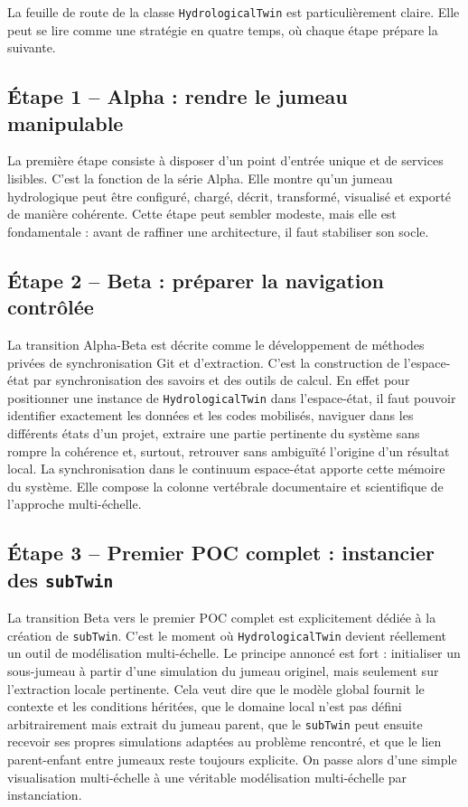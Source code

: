 \documentclass[11pt,a4paper]{article}
\newcommand{\hydrot}{\texttt{HydrologicalTwin}}
\newcommand{\subt}{\texttt{subTwin}}
\begin{document}
La feuille de route de la classe \texttt{HydrologicalTwin} est particulièrement claire. Elle peut se lire comme une stratégie en quatre temps, où chaque étape prépare la suivante.

\subsection{Étape 1 -- Alpha : rendre le jumeau manipulable}

La première étape consiste à disposer d'un point d'entrée unique et de services lisibles. C'est la fonction de la série Alpha. Elle montre qu'un jumeau hydrologique peut être configuré, chargé, décrit, transformé, visualisé et exporté de manière cohérente. Cette étape peut sembler modeste, mais elle est fondamentale : avant de raffiner une architecture, il faut stabiliser son socle.

\subsection{Étape 2 -- Beta : préparer la navigation contrôlée}

La transition Alpha-Beta est décrite comme le développement de méthodes privées de synchronisation Git et d'extraction. C'est la construction de l'espace-état par synchronisation des savoirs et des outils de calcul. En effet pour positionner une instance de \hydrot{} dans l'espace-état, il faut pouvoir identifier exactement les données et les codes mobilisés, naviguer dans les différents états d'un projet, extraire une partie pertinente du système sans rompre la cohérence et, surtout, retrouver sans ambiguïté l'origine d'un résultat local. La synchronisation dans le continuum espace-état apporte cette mémoire du système. Elle compose la colonne vertébrale documentaire et scientifique de l'approche multi-échelle.

\subsection{Étape 3 -- Premier POC complet : instancier des \subt{}}

La transition Beta vers le premier POC complet est explicitement dédiée à la création de \subt{}. C'est le moment où \hydrot{} devient réellement un outil de modélisation multi-échelle. Le principe annoncé est fort : initialiser un sous-jumeau à partir d'une simulation du jumeau originel, mais seulement sur l'extraction locale pertinente. Cela veut dire que le modèle global fournit le contexte et les conditions héritées, que le domaine local n'est pas défini arbitrairement mais extrait du jumeau parent, que le \subt{} peut ensuite recevoir ses propres simulations adaptées au problème rencontré, et que le lien parent-enfant entre jumeaux reste toujours explicite. On passe alors d'une simple visualisation multi-échelle à une véritable modélisation multi-échelle par instanciation.
\end{document}

